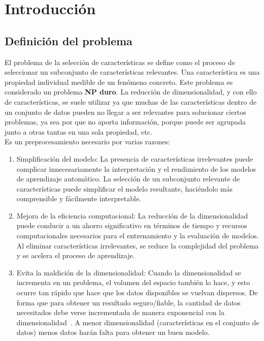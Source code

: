 \chapter{Introducción}
\section{Definición del problema}
El problema de la selección de características se define como el proceso de
seleccionar un subconjunto de características relevantes. Una característica es
una propiedad individual medible de un fenómeno concreto. Este problema es
considerado un problema \textbf{NP duro}. La reducción de dimensionalidad, y con
ello de características, se suele utilizar ya que muchas de las características
dentro de un conjunto de datos pueden no llegar a ser relevantes para solucionar
ciertos problemas, ya sea por que no aporta información, porque puede ser
agrupada junto a otras tantas en una sola propiedad, etc.\\[6pt]

Es un preprocesamiento necesario por varias razones:
\begin{enumerate}
    \item Simplificación del modelo: La presencia de características
          irrelevantes puede complicar innecesariamente la interpretación y el
          rendimiento de los modelos de aprendizaje automático. La selección de un
          subconjunto relevante de características puede simplificar el modelo
          resultante, haciéndolo más comprensible y fácilmente interpretable.

    \item Mejora de la eficiencia computacional: La reducción de la
          dimensionalidad puede conducir a un ahorro significativo en términos de
          tiempo y recursos computacionales necesarios para el entrenamiento y la
          evaluación de modelos. Al eliminar características irrelevantes, se reduce
          la complejidad del problema y se acelera el proceso de aprendizaje.

    \item Evita la maldición de la dimensionalidad: Cuando la dimensionalidad
          se incrementa en un problema, el volumen del espacio también lo hace, y esto ocurre
          tan rápido que  hace que los datos disponibles se vuelvan dispersos. De forma que para
          obtener un resultado seguro/fiable, la cantidad de datos necesitados debe verse
          incrementada de manera exponencial con la dimensionalidad~\cite{udacity2015curse}. A menor dimensionalidad
          (características en el conjunto de datos) menos datos harán falta para obtener un buen
          modelo.
\end{enumerate}

